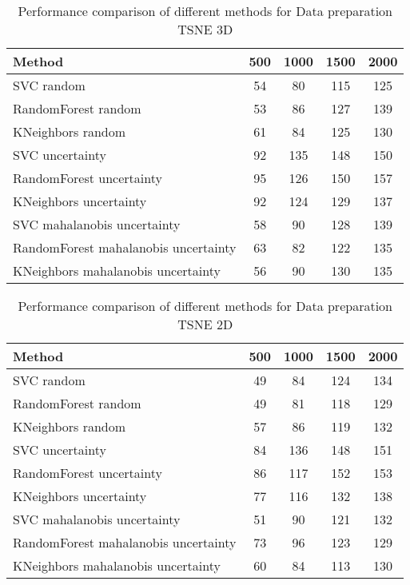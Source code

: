 \begin{table}[htbp]
    \centering
    \begin{tabular}{|l|c|c|c|c|}
    \hline
    \textbf{Method} & \textbf{500} & \textbf{1000} & \textbf{1500} & \textbf{2000} \\
    \hline
    SVC random & 54 & 80 & 115 & 125 \\
    RandomForest random & 53 & 86 & 127 & 139 \\
    KNeighbors random & 61 & 84 & 125 & 130 \\
    SVC uncertainty & 92 & 135 & 148 & 150 \\
    RandomForest uncertainty & 95 & 126 & 150 & 157 \\
    KNeighbors uncertainty & 92 & 124 & 129 & 137 \\
    SVC mahalanobis uncertainty & 58 & 90 & 128 & 139 \\
    RandomForest mahalanobis uncertainty & 63 & 82 & 122 & 135 \\
    KNeighbors mahalanobis uncertainty & 56 & 90 & 130 & 135 \\
    \hline
    \end{tabular}
    \caption{Performance comparison of different methods for Data preparation TSNE 3D}
    \label{tab:tsne_3d}
\end{table}

\begin{table}[htbp]
    \centering
    \begin{tabular}{|l|c|c|c|c|}
    \hline
    \textbf{Method} & \textbf{500} & \textbf{1000} & \textbf{1500} & \textbf{2000} \\
    \hline
    SVC random & 49 & 84 & 124 & 134 \\
    RandomForest random & 49 & 81 & 118 & 129 \\
    KNeighbors random & 57 & 86 & 119 & 132 \\
    SVC uncertainty & 84 & 136 & 148 & 151 \\
    RandomForest uncertainty & 86 & 117 & 152 & 153 \\
    KNeighbors uncertainty & 77 & 116 & 132 & 138 \\
    SVC mahalanobis uncertainty & 51 & 90 & 121 & 132 \\
    RandomForest mahalanobis uncertainty & 73 & 96 & 123 & 129 \\
    KNeighbors mahalanobis uncertainty & 60 & 84 & 113 & 130 \\
    \hline
    \end{tabular}
    \caption{Performance comparison of different methods for Data preparation TSNE 2D}
    \label{tab:tsne_2d}
\end{table}

